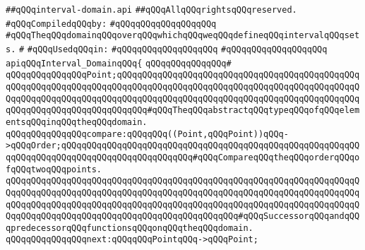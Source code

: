 \label{src/lib/src/interval-domain.api}
\verb|##qQQqinterval-domain.api|\newline
\verb|##qQQqAllqQQqrightsqQQqreserved.|\newline
\newline
\verb|#qQQqCompiledqQQqby:|\newline
\verb|#qQQqqQQqqQQqqQQqqQQq|\newline
\newline
\newline
\newline
\verb|#qQQqTheqQQqdomainqQQqoverqQQqwhichqQQqweqQQqdefineqQQqintervalqQQqsets.|\newline
\verb|#|\newline
\verb|#qQQqUsedqQQqin:|\newline
\verb|#qQQqqQQqqQQqqQQqqQQq|\newline
\verb|#qQQqqQQqqQQqqQQqqQQq|\newline
\newline
\verb|apiqQQqInterval_DomainqQQq{|\newline
\verb|qQQqqQQqqQQqqQQq#|\newline
\verb|qQQqqQQqqQQqqQQqPoint;qQQqqQQqqQQqqQQqqQQqqQQqqQQqqQQqqQQqqQQqqQQqqQQqqQQqqQQqqQQqqQQqqQQqqQQqqQQqqQQqqQQqqQQqqQQqqQQqqQQqqQQqqQQqqQQqqQQqqQQqqQQqqQQqqQQqqQQqqQQqqQQqqQQqqQQqqQQqqQQqqQQqqQQqqQQqqQQqqQQqqQQqqQQqqQQqqQQqqQQqqQQqqQQqqQQqqQQq#qQQqTheqQQqabstractqQQqtypeqQQqofqQQqelementsqQQqinqQQqtheqQQqdomain.|\newline
\newline
\verb|qQQqqQQqqQQqqQQqcompare:qQQqqQQq((Point,qQQqPoint))qQQq->qQQqOrder;qQQqqQQqqQQqqQQqqQQqqQQqqQQqqQQqqQQqqQQqqQQqqQQqqQQqqQQqqQQqqQQqqQQqqQQqqQQqqQQqqQQqqQQqqQQqqQQq#qQQqCompareqQQqtheqQQqorderqQQqofqQQqtwoqQQqpoints.|\newline
\newline
\verb|qQQqqQQqqQQqqQQqqQQqqQQqqQQqqQQqqQQqqQQqqQQqqQQqqQQqqQQqqQQqqQQqqQQqqQQqqQQqqQQqqQQqqQQqqQQqqQQqqQQqqQQqqQQqqQQqqQQqqQQqqQQqqQQqqQQqqQQqqQQqqQQqqQQqqQQqqQQqqQQqqQQqqQQqqQQqqQQqqQQqqQQqqQQqqQQqqQQqqQQqqQQqqQQqqQQqqQQqqQQqqQQqqQQqqQQqqQQqqQQqqQQqqQQqqQQqqQQq#qQQqSuccessorqQQqandqQQqpredecessorqQQqfunctionsqQQqonqQQqtheqQQqdomain.|\newline
\verb|qQQqqQQqqQQqqQQqnext:qQQqqQQqPointqQQq->qQQqPoint;|\newline
